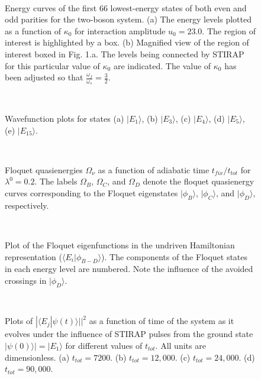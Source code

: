 \documentclass{article}
\begin{document}
%
\pagebreak
\listoffigures
\pagebreak
%
%

\begin{figure}[hbt]
\hspace*{-0.8in}
\ 
\caption{ Energy curves of the first $66$ lowest-energy states of both even and odd parities for the two-boson system.  (a) The energy levels plotted as a function of  $\kappa_0$ for interaction amplitude $u_0=23.0$. The region of interest is highlighted by a box. (b) Magnified view of the region of interest boxed in Fig. 1.a.  The levels being connected by STIRAP for this particular value of $\kappa_0$ are indicated. The value of $\kappa_0$ has been adjusted so that $\frac{\omega_f}{\omega_s}=\frac{3}{2}$.}
\label{fig:energylevels}
\end{figure}

\begin{figure}[hbt]
\ 
\caption{Wavefunction plots for states (a) $|E_1{\rangle}$, (b) $|E_3{\rangle}$, (c) $|E_4{\rangle}$, (d) $|E_5{\rangle}$, (e) $|E_{15}{\rangle}$.}
\label{fig:wavefunctions }
\end{figure}

\begin{figure}[hbt]
\vspace*{-0.1in}
\ 
\caption{Floquet quasienergies $\Omega_{\nu}$ as a function of adiabatic time $t_{fix}/t_{tot}$ for $\lambda^0=0.2$. The labels $\Omega_{B}$, $\Omega_{C}$, and $\Omega_{D}$  denote the floquet quasienergy curves corresponding to the Floquet eigenstates $|\phi_{B}\rangle$, $|\phi_{C}\rangle$, and $|\phi_{D}\rangle$,  respectively.}
\label{fig:floquet_quasi_0.2}
\end{figure}

\begin{figure}[hbt]
\ 
\caption{Plot of the Floquet eigenfunctions  in the undriven Hamiltonian representation ($\langle E_i|\phi_{B-D}\rangle$). The components of the Floquet states in each energy level are numbered. Note the influence of the avoided crossings in $|\phi_D\rangle$.}
\label{fig:floquet_states_0.2 }
\end{figure}

\begin{figure}[hbt]
\ 
\caption{Plots of $|{\langle}E_j|{\psi}(t){\rangle|}|^2$ as a function of time of the system as it evolves under the influence of STIRAP pulses from the ground state $|{\psi}(0){\rangle|}=\vert E_1\rangle$ for different values of  $t_{tot}$. All units are dimensionless. (a) $t_{tot}=7200$. (b) $t_{tot}=12,000$. (c) $t_{tot}=24,000$. (d) $t_{tot}=90,000$.}
\label{fig:timeev_groundstate }
\end{figure}
\end{document}
